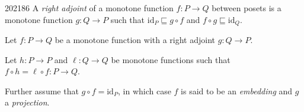 \documentclass[10pt,\jkfside,a4paper]{article}
\newcommand{\answer}[1]{
    \begin{tcolorbox}[colframe=black, colback=white, sharp corners, boxrule=0.2mm, breakable]
        #1
    \end{tcolorbox}
}
\newcommand{\qmarks}[1]{{\unskip\nobreak\hfil\penalty50\hskip2em\hbox{}\nobreak\hfil[#1]%
    \parfillskip=0pt \finalhyphendemerits=0 \par}}
\newcommand{\fix}{\mathit{fix}}
\begin{document}
\begin{examquestion}{2021}{8}{6}
A \emph{right adjoint} of a monotone function $f : P \to Q$ between posets is a monotone function $g : Q \to P$ such that $\mathrm{id}_P \sqsubseteq g \circ f$ and $f \circ g \sqsubseteq \mathrm{id}_Q$.

Let $f : P \to Q$ be a monotone function with a right adjoint $g : Q \to P$.

Let $h : P \to P$ and $\ell : Q \to Q$ be monotone functions such that $f \circ h = \ell \circ f : P \to Q$.

Further assume that $g \circ f = \mathrm{id}_P$, in which case $f$ is said to be an \emph{embedding} and $g$ a \emph{projection}.
\end{examquestion}
\end{document}
